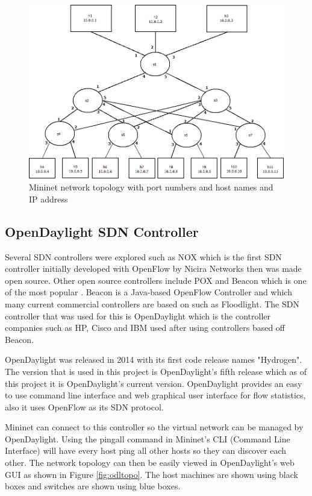 \begin{figure}[h!]
 \centering
 \includegraphics[width=\linewidth]{images/mnnetwork.png}
 \caption{Mininet network topology with port numbers and host names and IP address}
 \label{fig:mnnetwork}
\end{figure}

\subsection{OpenDaylight SDN Controller}
Several SDN controllers were explored such as NOX which is the first SDN controller initially developed with OpenFlow by Nicira Networks then was made open source. Other open source controllers include POX and Beacon which is one of the most popular \cite{sdncontroller}. Beacon is a Java-based OpenFlow Controller and which many current commercial controllers are based on such as Floodlight. The SDN controller that was used for this is OpenDaylight which is the controller companies such as HP, Cisco and IBM used after using controllers based off Beacon.
\newling
\par
OpenDaylight was released in 2014 with its first code release names "Hydrogen". The version that is used in this project is OpenDaylight's fifth release which as of this project it is OpenDaylight's current version. OpenDaylight provides an easy to use command line interface and web graphical user interface for flow statistics, also it uses OpenFlow as its SDN protocol.
\newline
\par
Mininet can connect to this controller so the virtual network can be managed by OpenDaylight. Using the pingall command in Mininet's CLI (Command Line Interface) will have every host ping all other hosts so they can discover each other. The network topology can then be easily viewed in OpenDaylight's web GUI as shown in Figure \ref{fig:odltopo}. The host machines are shown using black boxes and switches are shown using blue boxes.

